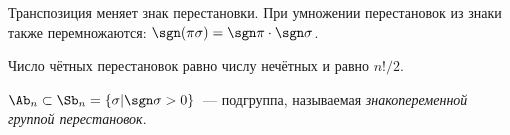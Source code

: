 \begin{note}
  Транспозиция меняет знак перестановки. При умножении перестановок из знаки также перемножаются: $\sgn(\pi\sigma)=\sgn\pi\cdot\sgn\sigma$.
\end{note}

\begin{note}
  Число чётных перестановок равно числу нечётных и равно $n!/2$.
\end{note}

\begin{df}
	$\Ab_n\subset\Sb_n=\{\sigma\vert\sgn\sigma>0\}$~--- подгруппа, называемая \emph{знакопеременной
	группой перестановок}.
\end{df}
